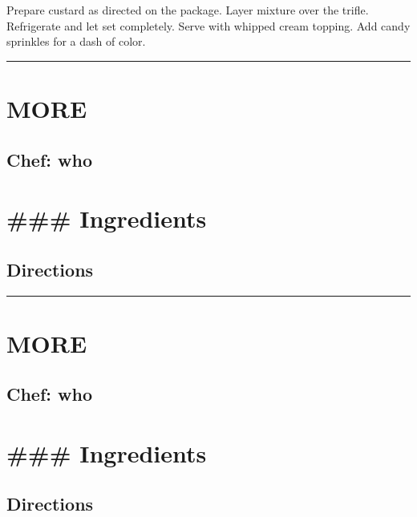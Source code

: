 \documentclass[
]{book}
\begin{document}
Prepare custard as directed on the package. Layer mixture over the trifle. Refrigerate and let set completely. Serve with whipped cream topping. Add candy sprinkles for a dash of color.

\begin{center}\rule{0.5\linewidth}{0.5pt}\end{center}

\hypertarget{more-4}{%
\section*{MORE}\label{more-4}}


\hypertarget{chef-who-4}{%
\subsection*{Chef: who}\label{chef-who-4}}


\hypertarget{ingredients-90}{%
\section*{\#\#\# Ingredients}\label{ingredients-90}}


\hypertarget{directions-90}{%
\subsection*{Directions}\label{directions-90}}


\begin{center}\rule{0.5\linewidth}{0.5pt}\end{center}

\hypertarget{more-5}{%
\section*{MORE}\label{more-5}}


\hypertarget{chef-who-5}{%
\subsection*{Chef: who}\label{chef-who-5}}


\hypertarget{ingredients-91}{%
\section*{\#\#\# Ingredients}\label{ingredients-91}}


\hypertarget{directions-91}{%
\subsection*{Directions}\label{directions-91}}
\end{document}
